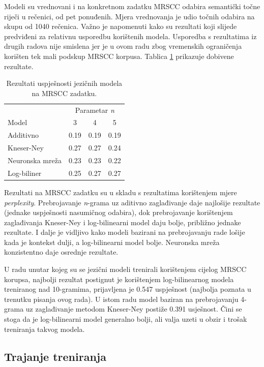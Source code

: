 \documentclass[times, utf8, diplomski, numeric]{fer}
\begin{document}
Modeli su vrednovani i na konkretnom zadatku MRSCC odabira semantički točne riječi u rečenici, od pet ponuđenih. Mjera vrednovanja je udio točnih odabira na skupu od 1040 rečenica. Važno je napomenuti kako su rezultati koji slijede predviđeni za relativnu usporedbu korištenih modela. Usporedba s rezultatima iz drugih radova nije smislena jer je u ovom radu zbog vremenskih ograničenja korišten tek mali podskup MRSCC korpusa. Tablica \ref{tbl:eval_mrscc} prikazuje dobivene rezultate.

\begin{table}[htb]
\caption{Rezultati uspješnosti jezičnih modela na MRSCC zadatku.}
\label{tbl:eval_mrscc}
\centering
\begin{tabular}{lccc}
\toprule
 & \multicolumn{3}{c}{Parametar \textit{n}} \\
\cmidrule(r){2-4}
Model & 3 & 4 & 5 \\
\midrule
Additivno &  0.19 & 0.19 & 0.19 \\
Kneser-Ney & 0.27 & 0.27 & 0.24 \\
Neuronska mreža & 0.23 & 0.23 & 0.22 \\
Log-biliner & 0.25 & 0.27 & 0.27 \\
\bottomrule
\end{tabular}
\end{table}

Rezultati na MRSCC zadatku su u skladu s rezultatima korištenjem mjere \textit{perplexity}. Prebrojavanje \textit{n}-grama uz aditivno zaglađivanje daje najlošije rezultate (jednake uspješnosti nasumičnog odabira), dok prebrojavanje korištenjem zaglađivanja Kneser-Ney i log-bilinearni model daju bolje, približno jednake rezultate. I dalje je vidljivo kako modeli bazirani na prebrojavanju rade lošije kada je kontekst dulji, a log-bilinearni model bolje. Neuronska mreža konzistentno daje osrednje rezultate.

U radu \cite{Mnih12afast} unutar kojeg su se jezični modeli trenirali korištenjem cijelog MRSCC korupsa, najbolji rezultat postignut je korištenjem log-bilinearnog modela treniranog nad 10-gramima, prijavljena je 0.547 uspješnost (najbolja poznata u trenutku pisanja ovog rada). U istom radu model baziran na prebrojavanju 4-grama uz zaglađivanje metodom Kneser-Ney postiže 0.391 usješnost. Čini se stoga da je log-bilinearni model generalno bolji, ali valja uzeti u obzir i trošak treniranja takvog modela.

\subsection{Trajanje treniranja}
\end{document}
